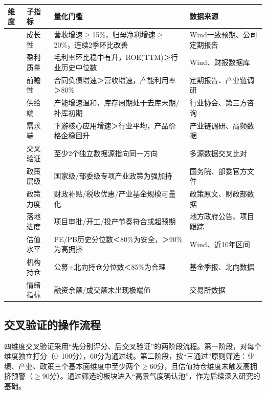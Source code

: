 \begin{exhibitbox}[图表2-2：四维度验证标准与量化门槛汇总]
\small
\begin{tabularx}{\textwidth}{L{1.5cm} L{2.2cm} X L{2.8cm}}
\toprule
\textbf{维度} & \textbf{子指标} & \textbf{量化门槛} & \textbf{数据来源} \\
\midrule
{} & 成长性 & 营收增速$\geq$15\%，归母净利增速$\geq$20\%，连续2季环比改善 & Wind一致预期、公司定期报告 \\
& 盈利质量 & 毛利率环比稳中有升，ROE(TTM)＞行业历史中位数 & Wind、财报数据库 \\
& 前瞻性 & 合同负债增速＞营收增速，产能利用率＞80\% & 定期报告、产业链调研 \\
\midrule
{} & 供给端 & 产能增速温和，库存周期处于去库末期/补库初期 & 行业协会、第三方咨询 \\
& 需求端 & 下游核心应用增速＞行业平均，产品价格企稳回升 & 产业链调研、高频数据 \\
& 交叉验证 & 至少2个独立数据源指向同一方向 & 多源数据交叉比对 \\
\midrule
{} & 政策层级 & 国家级/部委级专项产业政策为强加持 & 国务院、部委官方文件 \\
& 政策力度 & 财政补贴/税收优惠/产业基金规模可量化 & 政策原文、财政部数据 \\
& 落地进度 & 项目审批/开工/投产节奏符合或超预期 & 地方政府公告、项目跟踪 \\
\midrule
{} & 估值水平 & PE/PB历史分位数＜80\%为安全，＞90\%为高拥挤 & Wind、近10年区间 \\
& 机构持仓 & 公募+北向持仓分位数＜85\%为合理 & 基金季报、北向数据 \\
& 情绪指标 & 融资余额/成交额未出现极端值 & 交易所数据 \\
\bottomrule
\end{tabularx}
\end{exhibitbox}

\subsection{交叉验证的操作流程}

四维度交叉验证采用“先分别评分、后交叉验证”的两阶段流程。第一阶段，对每个维度独立打分（0--100分），60分为通过线。第二阶段，按“三通过”原则筛选：业绩、产业、政策三个基本面维度中至少两个$\geq$60分，且估值持仓维度未触发高拥挤预警（$\geq$90分）。通过筛选的板块进入“高景气度确认池”，作为后续深入研究的基础。

